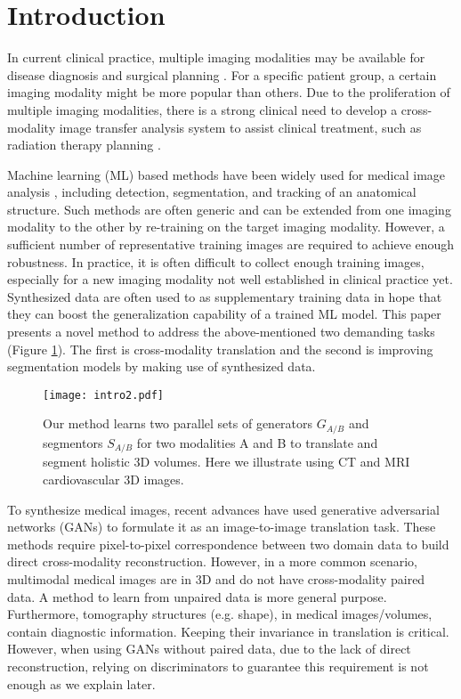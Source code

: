 \documentclass[10pt,twocolumn,letterpaper]{article}
\begin{document}
\vspace{-.2cm}
\section{Introduction}
In current clinical practice, multiple imaging modalities may be available for disease diagnosis and surgical planning \cite{cao2017dual}.
For a specific patient group, a certain imaging modality might be more popular than others.
Due to the proliferation of multiple imaging modalities, there is a strong clinical need to develop a cross-modality image transfer analysis system to assist clinical treatment, such as radiation therapy planning \cite{burgos2015robust}. 

Machine learning (ML) based methods have been widely used for medical image analysis \cite{Zhang_2017_CVPR,Zhang2017TandemNet}, including detection, segmentation, and tracking of an anatomical structure.
Such methods are often generic and can be extended from one imaging modality to the other by re-training on the target imaging modality.
However, a sufficient number of representative training images are required to achieve enough robustness.
In practice, it is often difficult to collect enough training images, especially for a new imaging modality not well established in clinical practice yet. 
Synthesized data are often used to as supplementary training data in hope that they can boost the generalization capability of a trained ML model.
This paper presents a novel method to address the above-mentioned two demanding tasks (Figure \ref{fig:intro}). The first is cross-modality translation and the second is improving segmentation models by making use of synthesized data. 


\begin{figure}[t]
	\begin{center}
		\texttt{[image: intro2.pdf]}
	\end{center}
	\vspace{-.4cm}
	\caption{Our method learns two parallel sets of generators $G_{A/B}$  and segmentors $S_{A/B}$ for two modalities A and B to translate and segment holistic 3D volumes. Here we illustrate using CT and MRI cardiovascular 3D images.} \label{fig:intro} \vspace{-.2cm}
\end{figure}

To synthesize medical images, recent advances \cite{nie2016medical,costa2017towards} have used generative adversarial networks (GANs) \cite{goodfellow2014generative} to formulate it as an image-to-image translation task. These methods require pixel-to-pixel correspondence between two domain data to build direct cross-modality reconstruction. 
However, in a more common scenario, multimodal medical images are in 3D and do not have cross-modality paired data.
A method to learn from unpaired data is more general purpose.
Furthermore, tomography structures (e.g. shape), in medical images/volumes, contain diagnostic information. Keeping their invariance in translation is critical. However, when using GANs without paired data, due to the lack of direct reconstruction,
relying on discriminators to guarantee this requirement is not enough as we explain later.
\end{document}
